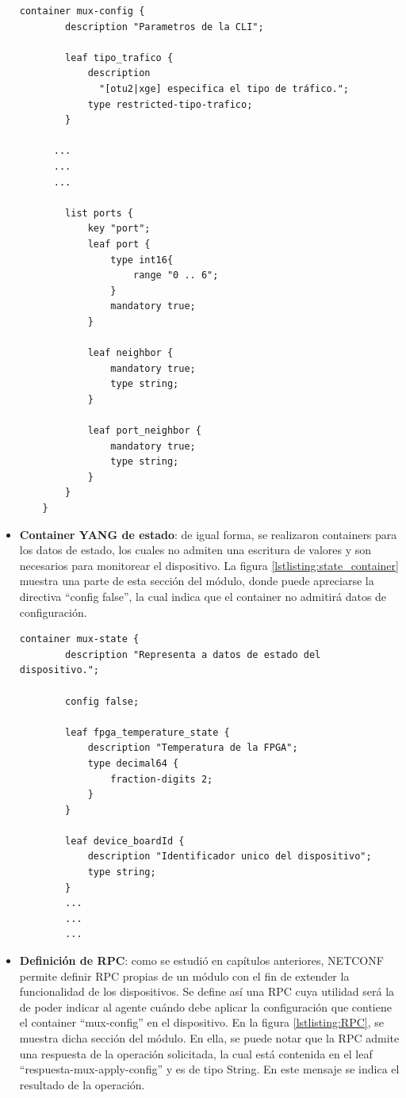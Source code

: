 \begin{itemize}
    \begin{lstlisting}[language=SHELXL, caption=Container de configuración., label=lstlisting:config_container]
    container mux-config {
        description "Parametros de la CLI";

        leaf tipo_trafico {
            description
              "[otu2|xge] especifica el tipo de tráfico.";
            type restricted-tipo-trafico;
        }
      
      ...
      ...
      ...
        
        list ports {
            key "port";
            leaf port {
                type int16{
                    range "0 .. 6";
                }
                mandatory true;
            }

            leaf neighbor {
                mandatory true;
                type string;
            }
            
            leaf port_neighbor {
                mandatory true;
                type string;
            }
        }
    }
    \end{lstlisting}

    \item \textbf{Container YANG de estado}: de igual forma, se realizaron containers para los datos de estado, los cuales no admiten una escritura de valores y son necesarios para monitorear el dispositivo. La figura \ref{lstlisting:state_container} muestra una parte de esta sección del módulo, donde puede apreciarse la directiva “config false”, la cual indica que el container no admitirá datos de configuración.  

    \begin{lstlisting}[language=SHELXL, caption=Container de estado., label=lstlisting:state_container]
    container mux-state {
        description "Representa a datos de estado del dispositivo.";
        
        config false;

        leaf fpga_temperature_state {
            description "Temperatura de la FPGA";
            type decimal64 {
                fraction-digits 2;
            }
        }
   
        leaf device_boardId {
            description "Identificador unico del dispositivo";
            type string;
        }
        ...
        ...
        ...
    \end{lstlisting}


    \item \textbf{Definición de RPC}: como se estudió en capítulos anteriores, NETCONF permite definir RPC propias de un módulo con el fin de extender la funcionalidad de los dispositivos. Se define así una RPC cuya utilidad será la de poder indicar al agente cuándo debe aplicar la configuración que contiene el container “mux-config” en el dispositivo. En la figura \ref{lstlisting:RPC}, se muestra dicha sección del módulo. En ella, se puede notar que la RPC admite una respuesta de la operación solicitada, la cual está contenida en el leaf “respuesta-mux-apply-config” y es de tipo String. En este mensaje se indica el resultado de la operación.


\end{itemize}
